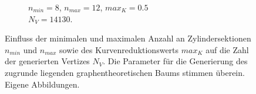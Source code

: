 \begin{figure} [hbtp]
\begin{subfigure}[t]{.45\textwidth}
		\caption{$n_{min} = 8$, $n_{max} = 12$, $max_K = 0.5$\\ $N_V = 14130$.}
		\label{subfig:SCA_Quali_CR_High}
	\end{subfigure}	
	\caption{Einfluss der minimalen und maximalen Anzahl an Zylindersektionen $n_{min}$ und $n_{max}$ sowie des Kurvenreduktionswerts $max_K$ auf die Zahl der generierten Vertizes $N_V$. Die Parameter für die Generierung des zugrunde liegenden graphentheoretischen Baums stimmen überein. Eigene Abbildungen.}
	\label{fig:SCA_Quali}
\end{figure}


